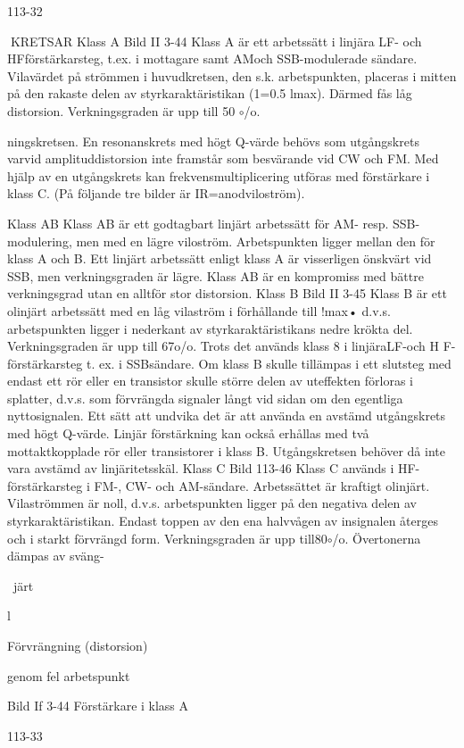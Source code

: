 {{{113-32

KRETSAR
Klass A
Bild II 3-44
Klass A är ett arbetssätt i linjära LF- och HFförstärkarsteg, t.ex. i mottagare samt AMoch SSB-modulerade sändare. Vilavärdet
på strömmen i huvudkretsen, den s.k. arbetspunkten, placeras i mitten på den rakaste delen av styrkaraktäristikan (1=0.5 lmax).
Därmed fås låg distorsion. Verkningsgraden
är upp till 50 \(\circ\)/o.

ningskretsen. En resonanskrets med högt
Q-värde behövs som utgångskrets varvid
amplituddistorsion inte framstår som besvärande vid CW och FM. Med hjälp av en
utgångskrets kan frekvensmultiplicering utföras med förstärkare i klass C.
(På följande tre bilder är IR=anodviloström).

Klass AB
Klass AB är ett godtagbart linjärt arbetssätt
för AM- resp. SSB-modulering, men med en
lägre viloström. Arbetspunkten ligger mellan
den för klass A och B. Ett linjärt arbetssätt
enligt klass A är visserligen önskvärt vid
SSB, men verkningsgraden är lägre. Klass
AB är en kompromiss med bättre verkningsgrad utan en alltför stor distorsion.
Klass B
Bild II 3-45
Klass B är ett olinjärt arbetssätt med en låg
vilaström i förhållande till !max• d.v.s. arbetspunkten ligger i nederkant av styrkaraktäristikans nedre krökta del. Verkningsgraden
är upp till 67o/o. Trots det används klass 8 i
linjäraLF-och H F-förstärkarsteg t. ex. i SSBsändare.
Om klass B skulle tillämpas i ett slutsteg
med endast ett rör eller en transistor skulle
större delen av uteffekten förloras i splatter,
d.v.s. som förvrängda signaler långt vid sidan om den egentliga nyttosignalen. Ett sätt
att undvika det är att använda en avstämd
utgångskrets med högt Q-värde. Linjär förstärkning kan också erhållas med två mottaktkopplade rör eller transistorer i klass B.
Utgångskretsen behöver då inte vara avstämd av linjäritetsskäl.
Klass C
Bild 113-46
Klass C används i HF-förstärkarsteg i FM-,
CW- och AM-sändare. Arbetssättet är kraftigt olinjärt. Vilaströmmen är noll, d.v.s. arbetspunkten ligger på den negativa delen av
styrkaraktäristikan. Endast toppen av den
ena halvvågen av insignalen återges och i
starkt förvrängd form. Verkningsgraden är
upp till80\(\circ\)/o. Övertonerna dämpas av sväng-

~järt

l

Förvrängning
(distorsion)

genom fel arbetspunkt

Bild If 3-44 Förstärkare i klass A

113-33

}}}

